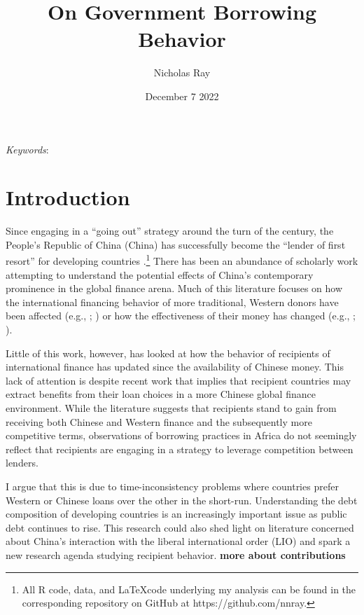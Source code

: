 \documentclass[12pt]{article}
\title{\vspace{-2.75cm}On Government Borrowing Behavior\vspace{-0.5cm}}
\author{Nicholas Ray}
\date{\vspace{-0.30cm}December 7 2022\vspace{-1cm}}
\begin{document}
\maketitle
\begin{abstract}
    
\end{abstract}

\textit{Keywords}: 

\section*{Introduction}
Since engaging in a ``going out'' strategy around the turn of the century, the People's Republic of China (China) has successfully become the ``lender of first resort'' for developing countries \parencite[1]{dreher2022}.\footnote{All R code, data, and \LaTeX \;code underlying my analysis can be found in the corresponding repository on GitHub at https://github.com/nnray.} There has been an abundance of scholarly work attempting to understand the potential effects of China's contemporary prominence in the global finance arena. Much of this literature focuses on how the international financing behavior of more traditional, Western donors have been affected (e.g., \cite{humphrey2019}; \cite{kilama2016a}) or how the effectiveness of their money has changed (e.g., \cite{blair2022}; \cite{gehring2022}).

Little of this work, however, has looked at how the behavior of recipients of international finance has updated since the availability of Chinese money. This lack of attention is despite recent work that implies that recipient countries may extract benefits from their loan choices in a more Chinese global finance environment. While the literature suggests that recipients stand to gain from receiving both Chinese and Western finance and the subsequently more competitive terms, observations of borrowing practices in Africa do not seemingly reflect that recipients are engaging in a strategy to leverage competition between lenders.

I argue that this is due to time-inconsistency problems where countries prefer Western or Chinese loans over the other in the short-run. Understanding the debt composition of developing countries is an increasingly important issue as public debt continues to rise. This research could also shed light on literature concerned about China's interaction with the liberal international order (LIO) and spark a new research agenda studying recipient behavior. \textbf{more about contributions}
\end{document}
